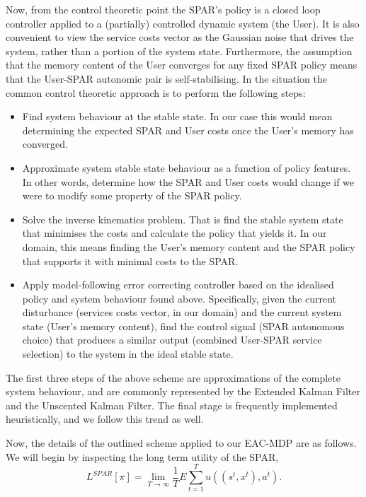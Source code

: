 \documentclass{msdm2012}
\begin{document}
Now, from the control theoretic point the SPAR's policy is a closed
loop controller applied to a (partially) controlled dynamic system
(the User). It is also convenient to view the service costs vector as
the Gaussian noise that drives the system, rather than a portion of
the system state. Furthermore, the assumption that the memory content
of the User converges for any fixed SPAR policy means that the
User-SPAR autonomic pair is self-stabilising. In the situation the
common control theoretic approach is to perform the following steps:
\begin{itemize}
\item Find system behaviour at the stable state. In our case this
  would mean determining the expected SPAR and User costs once the
  User's memory has converged.
\item Approximate system stable state behaviour as a function of
  policy features. In other words, determine how the SPAR and User
  costs would change if we were to modify some property of the SPAR
  policy.
\item Solve the inverse kinematics problem. That is find the stable
  system state that minimises the costs and calculate the policy that
  yields it. In our domain, this means finding the User's memory
  content and the SPAR policy that supports it with minimal costs to
  the SPAR.
\item Apply model-following error correcting controller based on the
  idealised policy and system behaviour found above. Specifically,
  given the current disturbance (services costs vector, in our domain)
  and the current system state (User's memory content), find the
  control signal (SPAR autonomous choice) that produces a similar
  output (combined User-SPAR service selection) to the system in the
  ideal stable state.
\end{itemize}

The first three steps of the above scheme are approximations of the
complete system behaviour, and are commonly represented by the
Extended Kalman Filter and the Unscented Kalman Filter. The final
stage is frequently implemented heuristically, and we follow this
trend as well.

Now, the details of the outlined scheme applied to our EAC-MDP are as follows.
We will begin by inspecting the long term utility of the SPAR, 
$$L^{SPAR}[\pi]=\lim\limits_{T\rightarrow\infty}\frac{1}{T}E\sum\limits_{t=1}^Tu((s^t,x^t),a^t).$$
\end{document}
